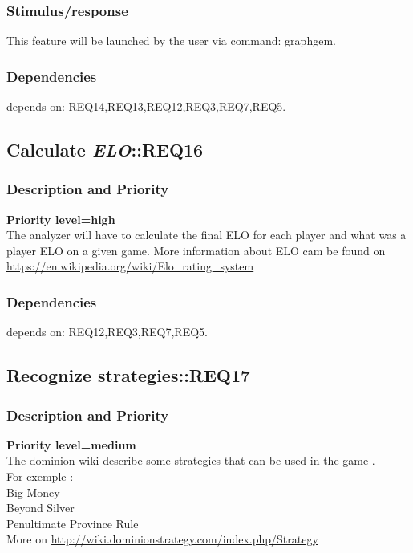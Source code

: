 \documentclass{scrreprt}
\begin{document}
\subsubsection{Stimulus/response}
This feature will be launched by the user via command: graphgem.
\subsubsection{Dependencies}
depends on: REQ14,REQ13,REQ12,REQ3,REQ7,REQ5.



\subsection{Calculate \textit{\textbf{ELO}}::REQ16}
\subsubsection{Description and Priority}
\textbf{Priority level=high}\\
The analyzer will have to calculate the final ELO for each player and what was a
player ELO on a given game.
More information about ELO cam be found on \url{https://en.wikipedia.org/wiki/Elo_rating_system}
\subsubsection{Dependencies}
depends on: REQ12,REQ3,REQ7,REQ5.

\subsection{Recognize strategies::REQ17}
\subsubsection{Description and Priority}
\textbf{Priority level=medium}\\

The dominion wiki describe some strategies that can be used in the game .\\ For exemple :\\
Big Money\\
Beyond Silver \\
Penultimate Province Rule \\
More on \url{http://wiki.dominionstrategy.com/index.php/Strategy}\\
\end{document}
